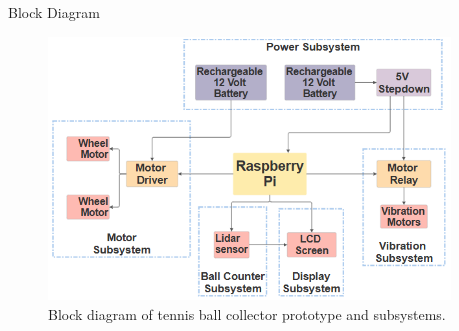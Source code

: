 \documentclass[final]{beamer}
\newlength{\sepwidth}
\newlength{\colwidth}
\newcommand{\separatorcolumn}{\begin{column}{\sepwidth}\end{column}}
\begin{document}
\begin{frame}[t]
\begin{columns}[t]

\separatorcolumn

\begin{column}{\colwidth}
  \begin{block}{Block Diagram}
      \begin{figure}
        \centering
        \includegraphics[width=22.0cm]{Images/Block_Diagram.png}
        \caption{Block diagram of tennis ball collector prototype and subsystems.}
      \end{figure}
  \end{block}
    

\end{column}
\end{columns}
\end{frame}
\end{document}
